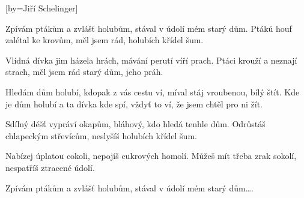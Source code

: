 [by={Jiří Schelinger}]

\beginverse{}
Zpívám ptákům a zvlášť holubům,
stával v údolí mém starý dům.
Ptáků houf zalétal ke krovům,
měl jsem rád, holubích křídel šum.
\endverse{}

\beginverse{}
Vlídná dívka jim házela hrách,
mávání perutí víří prach.
Ptáci krouží a neznají strach,
měl jsem rád starý dům, jeho práh.
\endverse{}

\beginchorus{}
Hledám dům holubí, kdopak z vás cestu ví,
míval stáj vroubenou, bílý štít.
Kde je dům holubí a ta dívka kde spí,
vždyť to ví, že jsem chtěl pro ni žít.
\endchorus{}

\beginverse{}
Sdílný déšť vypráví okapům,
bláhový, kdo hledá tenhle dům.
Odrůstáš chlapeckým střevícům,
neslyšíš holubích křídel šum.
\endverse{}

\beginverse{}
Nabízej úplatou cokoli,
nepojíš cukrových homolí.
Můžeš mít třeba zrak sokolí,
nespatříš ztracené údolí.
\endverse{}

\beginchorus{}
\phantom{}
\endchorus{}

\beginverse*{}
Zpívám ptákům a zvlášť holubům,
stával v údolí mém starý dům\ldots{}.
\endverse{}

\endsong{}
